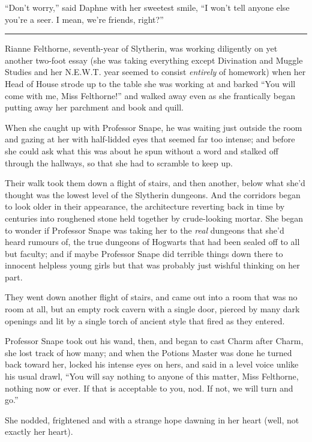 ``Don't worry,'' said Daphne with her sweetest smile, ``I won't tell
anyone else you're a seer. I mean, we're friends, right?''

\begin{center}\rule{3in}{0.4pt}\end{center}

Rianne Felthorne, seventh-year of Slytherin, was working diligently on
yet another two-foot essay (she was taking everything except Divination
and Muggle Studies and her N.E.W.T. year seemed to consist
\emph{entirely} of homework) when her Head of House strode up to the
table she was working at and barked ``You will come with me, Miss
Felthorne!'' and walked away even as she frantically began putting away
her parchment and book and quill.

When she caught up with Professor Snape, he was waiting just outside the
room and gazing at her with half-lidded eyes that seemed far too
intense; and before she could ask what this was about he spun without a
word and stalked off through the hallways, so that she had to scramble
to keep up.

Their walk took them down a flight of stairs, and then another, below
what she'd thought was the lowest level of the Slytherin dungeons. And
the corridors began to look older in their appearance, the architecture
reverting back in time by centuries into roughened stone held together
by crude-looking mortar. She began to wonder if Professor Snape was
taking her to the \emph{real} dungeons that she'd heard rumours of, the
true dungeons of Hogwarts that had been sealed off to all but faculty;
and if maybe Professor Snape did terrible things down there to innocent
helpless young girls but that was probably just wishful thinking on her
part.

They went down another flight of stairs, and came out into a room that
was no room at all, but an empty rock cavern with a single door, pierced
by many dark openings and lit by a single torch of ancient style that
fired as they entered.

Professor Snape took out his wand, then, and began to cast Charm after
Charm, she lost track of how many; and when the Potions Master was done
he turned back toward her, locked his intense eyes on hers, and said in
a level voice unlike his usual drawl, ``You will say nothing to anyone
of this matter, Miss Felthorne, nothing now or ever. If that is
acceptable to you, nod. If not, we will turn and go.''

She nodded, frightened and with a strange hope dawning in her heart
(well, not exactly her heart).

